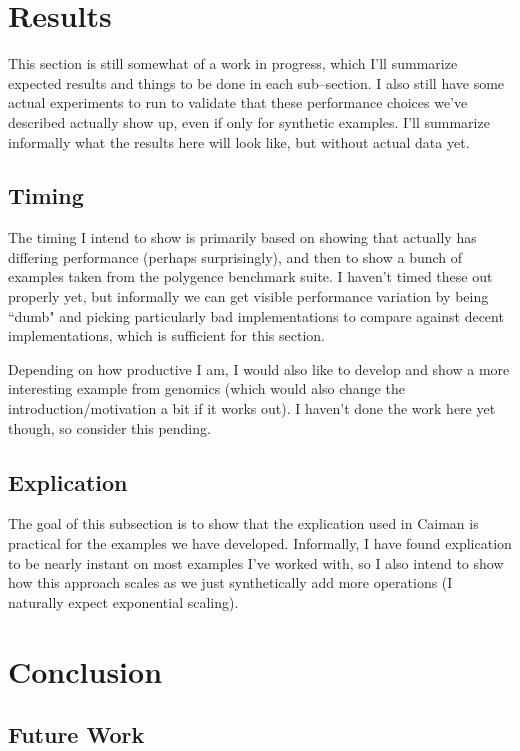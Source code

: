 \section{Results}
\label{sec:results}

This section is still somewhat of a work in progress, which I'll summarize expected results and things to be done in each sub--section.  I also still have some actual experiments to run to validate that these performance choices we've described actually show up, even if only for synthetic examples.  I'll summarize informally what the results here will look like, but without actual data yet.

\subsection{Timing}

The timing I intend to show is primarily based on showing that  actually has differing performance (perhaps surprisingly), and then to show a bunch of examples taken from the polygence benchmark suite.  I haven't timed these out properly yet, but informally we can get visible performance variation by being ``dumb" and picking particularly bad implementations to compare against decent implementations, which is sufficient for this section.

Depending on how productive I am, I would also like to develop and show a more interesting example from genomics (which would also change the introduction/motivation a bit if it works out).  I haven't done the work here yet though, so consider this pending.

\subsection{Explication}
\label{subsec:explicationresults}

The goal of this subsection is to show that the explication used in Caiman is practical for the examples we have developed.  Informally, I have found explication to be nearly instant on most examples I've worked with, so I also intend to show how this approach scales as we just synthetically add more operations (I naturally expect exponential scaling).

\section{Conclusion}
\label{sec:conclusion}


\subsection{Future Work}
\label{subsec:future}

